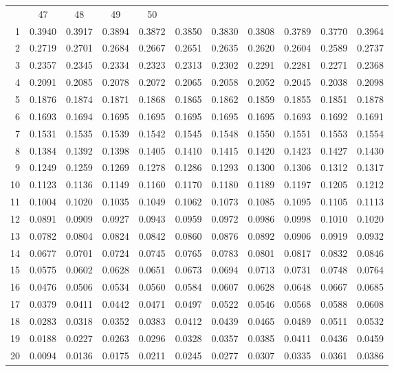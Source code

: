 \documentclass[draft]{article}
\begin{document}
\begin{table}
\begin{center}
\begin{tabular}{rcccccccccc}
  & \multicolumn{1}{c}{47} 
  & \multicolumn{1}{c}{48} 
  & \multicolumn{1}{c}{49} 
  & \multicolumn{1}{c}{50} \\ \cline{2-11}
 1&0.3940&0.3917&0.3894&0.3872&0.3850&0.3830&0.3808&0.3789&0.3770&0.3964\\
 2&0.2719&0.2701&0.2684&0.2667&0.2651&0.2635&0.2620&0.2604&0.2589&0.2737\\
 3&0.2357&0.2345&0.2334&0.2323&0.2313&0.2302&0.2291&0.2281&0.2271&0.2368\\
 4&0.2091&0.2085&0.2078&0.2072&0.2065&0.2058&0.2052&0.2045&0.2038&0.2098\\
 5&0.1876&0.1874&0.1871&0.1868&0.1865&0.1862&0.1859&0.1855&0.1851&0.1878\\
 6&0.1693&0.1694&0.1695&0.1695&0.1695&0.1695&0.1695&0.1693&0.1692&0.1691\\
 7&0.1531&0.1535&0.1539&0.1542&0.1545&0.1548&0.1550&0.1551&0.1553&0.1554\\%
 8&0.1384&0.1392&0.1398&0.1405&0.1410&0.1415&0.1420&0.1423&0.1427&0.1430\\%
 9&0.1249&0.1259&0.1269&0.1278&0.1286&0.1293&0.1300&0.1306&0.1312&0.1317\\%
10&0.1123&0.1136&0.1149&0.1160&0.1170&0.1180&0.1189&0.1197&0.1205&0.1212\\%
11&0.1004&0.1020&0.1035&0.1049&0.1062&0.1073&0.1085&0.1095&0.1105&0.1113\\
12&0.0891&0.0909&0.0927&0.0943&0.0959&0.0972&0.0986&0.0998&0.1010&0.1020\\
13&0.0782&0.0804&0.0824&0.0842&0.0860&0.0876&0.0892&0.0906&0.0919&0.0932\\
14&0.0677&0.0701&0.0724&0.0745&0.0765&0.0783&0.0801&0.0817&0.0832&0.0846\\
15&0.0575&0.0602&0.0628&0.0651&0.0673&0.0694&0.0713&0.0731&0.0748&0.0764\\
16&0.0476&0.0506&0.0534&0.0560&0.0584&0.0607&0.0628&0.0648&0.0667&0.0685\\
17&0.0379&0.0411&0.0442&0.0471&0.0497&0.0522&0.0546&0.0568&0.0588&0.0608\\
18&0.0283&0.0318&0.0352&0.0383&0.0412&0.0439&0.0465&0.0489&0.0511&0.0532\\
19&0.0188&0.0227&0.0263&0.0296&0.0328&0.0357&0.0385&0.0411&0.0436&0.0459\\
20&0.0094&0.0136&0.0175&0.0211&0.0245&0.0277&0.0307&0.0335&0.0361&0.0386\\

\end{tabular}
\end{center}
\end{table}
\end{document}
